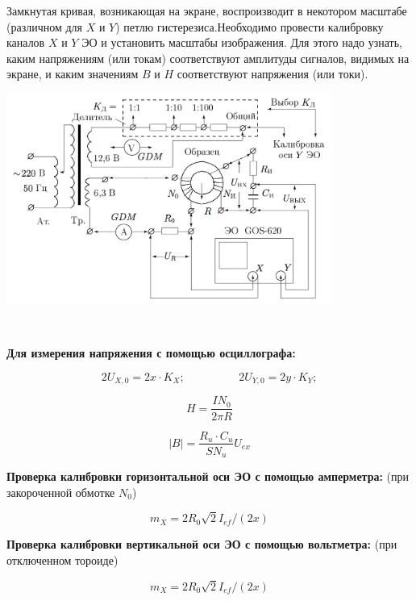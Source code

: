 \documentclass[a4paper, 14pt]{extarticle}
\begin{document}
Замкнутая кривая, возникающая на экране, воспроизводит в некотором масштабе (различном для $X$ и $Y$) петлю гистерезиса.Необходимо провести калибровку каналов $X$ и $Y$ ЭО и установить масштабы изображения. Для этого надо узнать, каким напряжениям (или токам) соответствуют амплитуды сигналов, видимых на экране, и каким значениям $B$ и $H$ соответствуют напряжения (или токи).
\begin{center}
	\includegraphics[width = 0.8\textwidth]{pics/345-1.png}
\end{center}\

\textbf{Для измерения напряжения с помощью осциллографа:}

\begin{equation}\label{}
    2U_{X,0}=2x\cdot K_X; \hspace{2cm} 2U_{Y,0}=2y\cdot K_Y;
\end{equation}

\begin{equation}\label{}
    H=\frac{IN_0}{2\pi R}
\end{equation}

\begin{equation}\label{}
    |B|=\frac{R_u \cdot C_u}{SN_u}U_{ex}
\end{equation}


\textbf{Проверка калибровки горизонтальной оси ЭО с помощью амперметра:} (при закороченной обмотке $N_0$) 


\begin{equation}\label{}
    m_X=2R_0\sqrt{2}I_{ef}/(2x) 
\end{equation}

\textbf{Проверка калибровки вертикальной оси ЭО с помощью вольтметра:} (при отключенном тороиде)


\begin{equation}\label{}
    m_X=2R_0\sqrt{2}I_{ef}/(2x) 
\end{equation}
\end{document}
